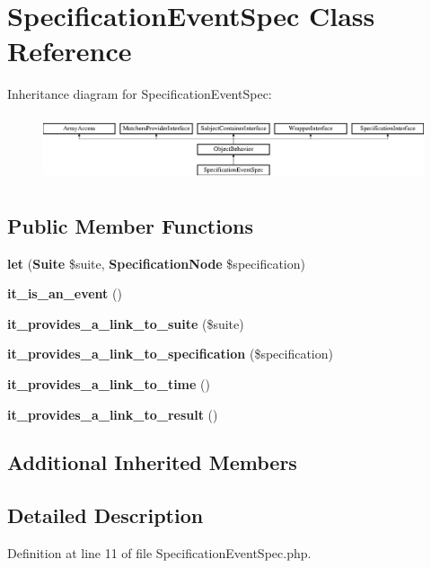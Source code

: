 \section{Specification\+Event\+Spec Class Reference}
\label{classspec_1_1_php_spec_1_1_event_1_1_specification_event_spec}
Inheritance diagram for Specification\+Event\+Spec\+:\begin{figure}[H]
\begin{center}
\leavevmode
\includegraphics[height=1.953488cm]{classspec_1_1_php_spec_1_1_event_1_1_specification_event_spec}
\end{center}
\end{figure}
\subsection*{Public Member Functions}
\begin{DoxyCompactItemize}
\item 
{\bf let} ({\bf Suite} \$suite, {\bf Specification\+Node} \$specification)
\item 
{\bf it\+\_\+is\+\_\+an\+\_\+event} ()
\item 
{\bf it\+\_\+provides\+\_\+a\+\_\+link\+\_\+to\+\_\+suite} (\$suite)
\item 
{\bf it\+\_\+provides\+\_\+a\+\_\+link\+\_\+to\+\_\+specification} (\$specification)
\item 
{\bf it\+\_\+provides\+\_\+a\+\_\+link\+\_\+to\+\_\+time} ()
\item 
{\bf it\+\_\+provides\+\_\+a\+\_\+link\+\_\+to\+\_\+result} ()
\end{DoxyCompactItemize}
\subsection*{Additional Inherited Members}


\subsection{Detailed Description}


Definition at line 11 of file Specification\+Event\+Spec.\+php.



